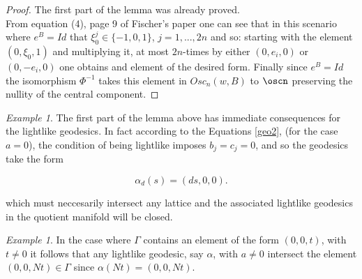 \documentclass[11pt]{amsart}
\theoremstyle{plain}
\theoremstyle{definition}
\theoremstyle{remark}
\newtheorem{rem}{Remark}
\newtheorem{exa}[thm]{Example}
\begin{document}
\begin{proof}







The first part of the lemma was already proved.\\

    From equation (4), page 9 of Fischer's paper one can see that in this scenario where $e^B = Id$ that $\xi_0^j \in \{ -1,0,1 \}$, $j=1, ..., 2n$ and so: starting with the element $(0,\xi_0,1)$ and multiplying it, at most $2n$-times by either $(0,e_i,0)$ or $(0,-e_i,0)$ one obtains and element of the desired form. Finally since $e^B = Id$ the isomorphism $\Phi^{-1}$ takes this element in $Osc_n(w,B)$ to $\oscn$ preserving the nullity of the central component.
\end{proof}


\begin{exa} 
The first part of the lemma above has immediate consequences for the lightlike geodesics. In fact according to the Equations \eqref{geo2}, (for the case $a=0$),  the condition of being lightlike imposes  $b_j=c_j=0$, and so the geodesics take the form

\begin{equation*}
\alpha_d(s)=(ds,0,0).
\end{equation*}

which must neccesarily intersect any lattice and the associated lightlike geodesics in the quotient manifold will be closed.
\end{exa}




\begin{exa}
In the case where $\Gamma$ contains an element of the form $(0,0,t)$, with $t \neq 0$ it follows that any lightlike geodesic, say $\alpha$, with $a \neq 0$ intersect the element $(0,0, Nt) \in \Gamma$ since $\alpha(Nt) = (0,0,Nt)$.
\end{exa}
\end{document}

